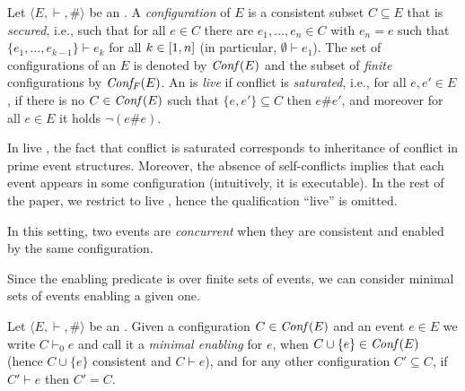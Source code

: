 \begin{definition}
  Let $\langle E, \vdash, \# \rangle$ be an {\esabbr}. A
  \emph{configuration} of $E$ is a consistent subset $C \subseteq E$
  that is \emph{secured}, i.e., such that for all $e \in C$ there are
  $e_1, \ldots, e_n \in C$ with $e_n =e$ such that
  $\{ e_1, \ldots, e_{k-1} \} \vdash e_k$ for all $k \in [{1},{n}]$
  (in particular, $\emptyset \vdash e_1$). The set of configurations
  of an {\esabbr} $E$ is denoted by $\mathit{Conf}({E})$ and the subset of
  \emph{finite} configurations by $\mathit{Conf_F}({E})$.
  An {\esabbr} is \emph{live} if conflict is 
 \emph{saturated}, i.e., for all
  $e, e' \in E$, if there is no $C \in \mathit{Conf}({E})$ such that
  $\{e,e'\} \subseteq C$ then $e \# e'$, and moreover
  for all $e \in E$ it holds $\neg (e \# e)$.
\end{definition}

\begin{remark}
  In live {\esabbr}, the fact that conflict is saturated corresponds
  to inheritance of conflict in prime event structures. Moreover, the
  absence of self-conflicts implies that each event appears in some
  configuration (intuitively, it is executable). In the rest of the
  paper, we restrict to live {\esabbr}, hence the qualification
  ``live'' is omitted.
\end{remark}


In this setting, two events are \emph{concurrent} when they are consistent
and enabled by the same configuration.


Since the enabling predicate is over finite sets of events, we can
consider minimal sets of events enabling a given one.

\begin{definition}
  \label{de:minimimal-enabling}
  Let $\langle E, \vdash, \# \rangle$ be an {\esabbr}. Given a
  configuration $C \in \mathit{Conf}({{E}})$ and an event $e \in E$ we write
  $C \vdash_0 e$ and call it a \emph{minimal enabling} for $e$, when
  $C \cup \{ e \} \in \mathit{Conf}({E})$ (hence $C \cup \{ e \}$ consistent and
  $C \vdash e$), and for any other configuration $C' \subseteq C$, if
  $C' \vdash e$ then $C' = C$.
\end{definition}

